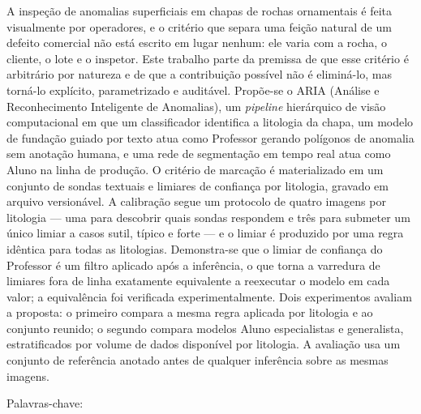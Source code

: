 \begin{resumo}
  \vspace{-15pt}

  A inspeção de anomalias superficiais em chapas de rochas ornamentais é feita visualmente por operadores, e o critério que separa uma feição natural de um defeito comercial não está escrito em lugar nenhum: ele varia com a rocha, o cliente, o lote e o inspetor. Este trabalho parte da premissa de que esse critério é arbitrário por natureza e de que a contribuição possível não é eliminá-lo, mas torná-lo explícito, parametrizado e auditável. Propõe-se o ARIA (Análise e Reconhecimento Inteligente de Anomalias), um \textit{pipeline} hierárquico de visão computacional em que um classificador identifica a litologia da chapa, um modelo de fundação guiado por texto atua como Professor gerando polígonos de anomalia sem anotação humana, e uma rede de segmentação em tempo real atua como Aluno na linha de produção. O critério de marcação é materializado em um conjunto de sondas textuais e limiares de confiança por litologia, gravado em arquivo versionável. A calibração segue um protocolo de quatro imagens por litologia --- uma para descobrir quais sondas respondem e três para submeter um único limiar a casos sutil, típico e forte --- e o limiar é produzido por uma regra idêntica para todas as litologias. Demonstra-se que o limiar de confiança do Professor é um filtro aplicado após a inferência, o que torna a varredura de limiares fora de linha exatamente equivalente a reexecutar o modelo em cada valor; a equivalência foi verificada experimentalmente. Dois experimentos avaliam a proposta: o primeiro compara a mesma regra aplicada por litologia e ao conjunto reunido; o segundo compara modelos Aluno especialistas e generalista, estratificados por volume de dados disponível por litologia. A avaliação usa um conjunto de referência anotado antes de qualquer inferência sobre as mesmas imagens.

  Palavras-chave: \palavraschaveemlinha
\end{resumo}


